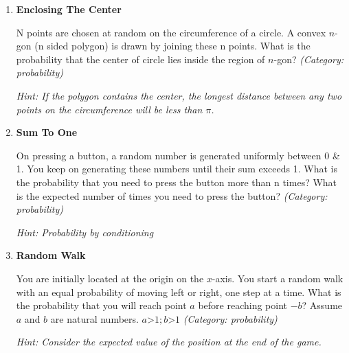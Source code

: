 \begin{enumerate}

\item \textbf{Enclosing The Center}

N points are chosen at random on the circumference of a circle. A convex $n$-gon (n sided polygon) is drawn by joining these n points. What is the probability that the center of circle lies inside the region of $n$-gon?
\small\emph{(Category: probability)}

\small\emph{Hint: If the polygon contains the center, the longest distance between any two points on the circumference will be less than $\pi$.}





\item \textbf{Sum To One}

On pressing a button, a random number is generated uniformly between 0 \& 1. You keep on generating these numbers until their sum exceeds 1. What is the probability that you need to press the button more than n times? What is the expected number of times you need to press the button?
\small\emph{(Category: probability)}

\small\emph{Hint: Probability by conditioning}





\item \textbf{Random Walk}

You are initially located at the origin on the $x$-axis. You start a random walk with an equal probability of moving left or right, one step at a time. What is the probability that you will reach point $a$ before reaching point $-b$?
Assume $a$ and $b$ are natural numbers. $a $>$1; b $>$ 1$
\small\emph{(Category: probability)}

\small\emph{Hint: Consider the expected value of the position at the end of the game.}






\end{enumerate}
